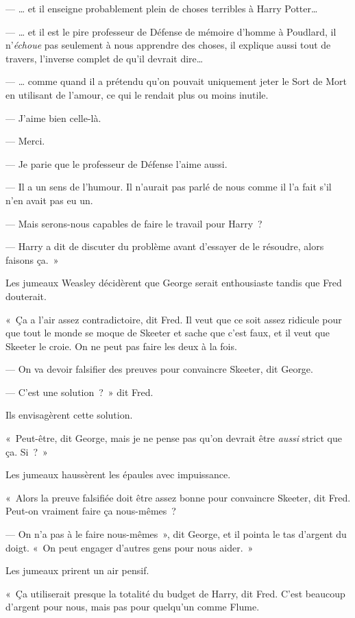 --- … et il enseigne probablement plein de choses terribles à Harry Potter…

--- … et il est le pire professeur de Défense de mémoire d'homme à Poudlard, il n'\emph{échoue} pas seulement à nous apprendre des choses, il explique aussi tout de travers, l'inverse complet de qu'il devrait dire…

--- … comme quand il a prétendu qu'on pouvait uniquement jeter le Sort de Mort en utilisant de l'amour, ce qui le rendait plus ou moins inutile.

--- J'aime bien celle-là.

--- Merci.

--- Je parie que le professeur de Défense l'aime aussi.

--- Il a un sens de l'humour.
Il n'aurait pas parlé de nous comme il l'a fait s'il n'en avait pas eu un.

--- Mais serons-nous capables de faire le travail pour Harry~?

--- Harry a dit de discuter du problème avant d'essayer de le résoudre, alors faisons ça.~»

Les jumeaux Weasley décidèrent que George serait enthousiaste tandis que Fred douterait.

«~Ça a l'air assez contradictoire, dit Fred.
Il veut que ce soit assez ridicule pour que tout le monde se moque de Skeeter et sache que c'est faux, et il veut que Skeeter le croie.
On ne peut pas faire les deux à la fois.

--- On va devoir falsifier des preuves pour convaincre Skeeter, dit George.

--- C'est une solution~?~»
dit Fred.

Ils envisagèrent cette solution.

«~Peut-être, dit George, mais je ne pense pas qu'on devrait être \emph{aussi} strict que ça.
Si~?~»

Les jumeaux haussèrent les épaules avec impuissance.

«~Alors la preuve falsifiée doit être assez bonne pour convaincre Skeeter, dit Fred.
Peut-on vraiment faire ça nous-mêmes~?

--- On n'a pas à le faire nous-mêmes~», dit George, et il pointa le tas d'argent du doigt.
«~On peut engager d'autres gens pour nous aider.~»

Les jumeaux prirent un air pensif.

«~Ça utiliserait presque la totalité du budget de Harry, dit Fred.
C'est beaucoup d'argent pour nous, mais pas pour quelqu'un comme Flume.

